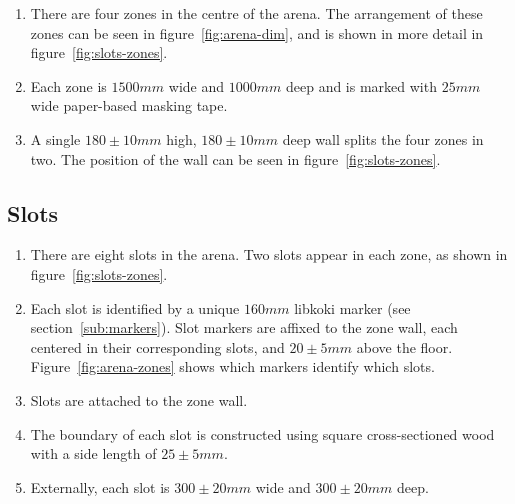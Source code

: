 \begin{enumerate}
\item There are four zones in the centre of the arena.
      The arrangement of these zones can be seen in figure~\ref{fig:arena-dim}, and is shown in more detail in figure~\ref{fig:slots-zones}.

\item Each zone is $1500mm$ wide and $1000mm$ deep and is  marked with $25mm$ wide paper-based masking tape.

\item A single $180 \pm 10mm$ high, $180 \pm 10mm$ deep wall splits the four zones in two.
      The position of the wall can be seen in figure~\ref{fig:slots-zones}.
\end{enumerate}


\subsection{Slots}
\label{sub:slots}

\begin{enumerate}
\item There are eight slots in the arena.
      Two slots appear in each zone, as shown in figure~\ref{fig:slots-zones}.

\item Each slot is identified by a unique $160mm$ libkoki marker (see section~\ref{sub:markers}).
      Slot markers are affixed to the zone wall, each centered in their corresponding slots, and $20 \pm 5mm$ above the floor.
      Figure~\ref{fig:arena-zones} shows which markers identify which slots.

\item Slots are attached to the zone wall.

\item The boundary of each slot is constructed using square cross-sectioned wood with a side length of $25 \pm 5mm$.

\item Externally, each slot is $300 \pm 20mm$ wide and $300 \pm 20mm$ deep.

\end{enumerate}


